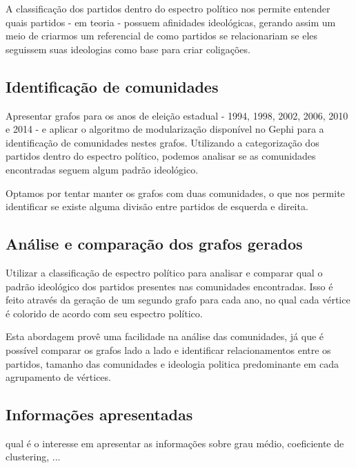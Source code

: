 A classificação dos partidos dentro do espectro político nos permite entender quais partidos - em teoria - possuem afinidades ideológicas, gerando assim um meio de criarmos um referencial de como partidos se relacionariam se eles seguissem suas ideologias como base para criar coligações.

\subsection{Identificação de comunidades}
\label{proposta__objetivos-especificos--identificacao-comunidades}

Apresentar grafos para os anos de eleição estadual - 1994, 1998, 2002, 2006, 2010 e 2014 - e aplicar o algoritmo de modularização disponível no Gephi para a identificação de comunidades nestes grafos. Utilizando a categorização dos partidos dentro do espectro político, podemos analisar se as comunidades encontradas seguem algum padrão ideológico.

Optamos por tentar manter os grafos com duas comunidades, o que nos permite identificar se existe alguma divisão entre partidos de esquerda e direita.

\subsection{Análise e comparação dos grafos gerados}
\label{proposta__objetivos-especificos--analise-comparacao}

Utilizar a classificação de espectro político para analisar e comparar qual o padrão ideológico dos partidos presentes nas comunidades encontradas. Isso é feito através da geração de um segundo grafo para cada ano, no qual cada vértice é colorido de acordo com seu espectro político.

Esta abordagem provê uma facilidade na análise das comunidades, já que é possível comparar os grafos lado a lado e identificar relacionamentos entre os partidos, tamanho das comunidades e ideologia politica predominante em cada agrupamento de vértices.
\subsection{Informações apresentadas}
\label{proposta__objetivos-especificos--informacoes-apresentadas}

qual é o interesse em apresentar as informações sobre grau médio, coeficiente de clustering, ...
